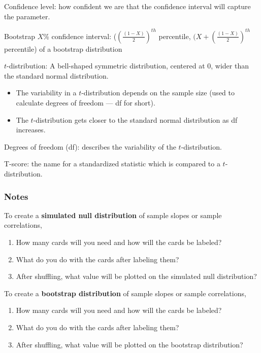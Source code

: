\documentclass[
]{report}
\providecommand{\tightlist}{%
  \setlength{\itemsep}{0pt}\setlength{\parskip}{0pt}}
\newcommand{\rgs}{\vspace{12pt}} %
\begin{document}
Confidence level: how confident we are that the confidence interval will capture the parameter.

Bootstrap \(X\)\% confidence interval: (\((\frac{(1-X)}{2})^{th}\) percentile, \((X+(\frac{(1-X)}{2})^{th}\) percentile) of a bootstrap distribution

\(t\)-distribution: A bell-shaped symmetric distribution, centered at 0, wider than the standard normal distribution.

\begin{itemize}
\tightlist
\item
  The variability in a \(t\)-distribution depends on the sample size (used to calculate degrees of freedom --- df for short).
\item
  The \(t\)-distribution gets closer to the standard normal distribution as df increases.
\end{itemize}

Degrees of freedom (df): describes the variability of the \(t\)-distribution.

T-score: the name for a standardized statistic which is compared to a \(t\)-distribution.

\hypertarget{notes-25}{%
\subsubsection*{Notes}\label{notes-25}}

To create a \textbf{simulated null distribution} of sample slopes or sample correlations,

\begin{enumerate}
\def\labelenumi{\arabic{enumi}.}
\item
  How many cards will you need and how will the cards be labeled?
  \rgs
\item
  What do you do with the cards after labeling them?
  \rgs
\item
  After shuffling, what value will be plotted on the simulated null distribution?
  \rgs
\end{enumerate}

To create a \textbf{bootstrap distribution} of sample slopes or sample correlations,

\begin{enumerate}
\def\labelenumi{\arabic{enumi}.}
\item
  How many cards will you need and how will the cards be labeled?
  \rgs
\item
  What do you do with the cards after labeling them?
  \rgs
\item
  After shuffling, what value will be plotted on the bootstrap distribution?
  \rgs
\end{enumerate}
\end{document}
